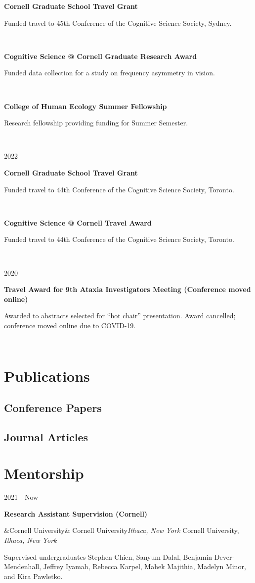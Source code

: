 \documentclass{article}
\newcommand{\entry}[5]{

  \begin{minipage}[t]{.15\textwidth}
    \begin{flushright}
      \hfill {#1}
    \end{flushright}
  \end{minipage}
  \hfill\vline\hfill
  \begin{minipage}[t]{.80\textwidth}
    \textbf{#2}

    \ifx&#3&
      {#3}\textit{#4}
    \else
      {#3, }\textit{#4}

    \fi
    \footnotesize{#5}
  \end{minipage}\\\vspace{.25cm}
}
\newcommand{\awardentry}[3]{
  \begin{minipage}[t]{.15\textwidth}
    \begin{flushright}
      \hfill {#1}
    \end{flushright}
  \end{minipage}
  \hfill\vline\hfill
  \begin{minipage}[t]{.80\textwidth}
    \textbf{#2}

    \footnotesize{#3}
  \end{minipage}\\\vspace{.25cm}
}
\newcommand{\cu}{Cornell University}
\begin{document}
\awardentry{}{Cornell Graduate School Travel Grant}
{Funded travel to 45th Conference of the Cognitive Science Society, Sydney.}

\awardentry{}{Cognitive Science @ Cornell Graduate Research Award}
{Funded data collection for a study on frequency asymmetry in vision.}

\awardentry{}{College of Human Ecology Summer Fellowship}
{Research fellowship providing funding for Summer Semester.}

\awardentry{2022}{Cornell Graduate School Travel Grant}
{Funded travel to 44th Conference of the Cognitive Science Society, Toronto.}

\awardentry{}{Cognitive Science @ Cornell Travel Award}
{Funded travel to 44th Conference of the Cognitive Science Society, Toronto.}

\awardentry{2020}{Travel Award for 9th Ataxia Investigators Meeting (Conference moved online)}
{Awarded to abstracts selected for “hot chair” presentation. Award cancelled; conference moved online due to COVID-19.}


\section{Publications}

\subsection{Conference Papers}
\nocite{*}
\printbibliography[heading=none]

\subsection{Journal Articles}
\nocite{*}
\printbibliography[heading=none]



\section{Mentorship}

\entry{2021~\textendash~Now}{Research Assistant Supervision (Cornell)}
{\cu}{Ithaca, New York}
{Supervised undergraduates Stephen Chien, Sanyum Dalal, Benjamin Dever-Mendenhall, Jeffrey Iyamah, Rebecca Karpel, Mahek Majithia, Madelyn Minor, and Kira Pawletko.}
\end{document}
